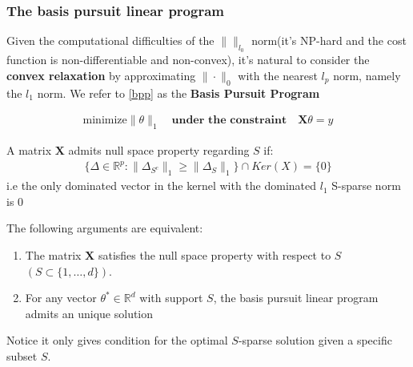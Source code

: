 \begin{method}
\end{method}

\subsubsection*{The basis pursuit linear program}

Given the computational difficulties of the $\|\|_{l_0}$ norm(it's NP-hard and the cost function is non-differentiable and non-convex), it's natural to consider the \textbf{convex relaxation} by approximating $\|\cdot\|_0$ with the nearest $l_p$ norm, namely the $l_1$ norm. We refer to \ref{bpp} as the \textbf{Basis Pursuit Program}

\begin{method}
\begin{align}\label{bpp}
	\text{minimize} \|\theta\|_1 \quad \textbf{under the constraint}\quad \mathbf{X} \theta = y
\end{align}
\end{method}


\begin{definition}
	A matrix $\mathbf{X}$ admits null space property regarding $S$ if:
	\begin{align*}
		\{ \Delta \in \mathbb{R}^p: \|\Delta_{S^c}\|_1 \geq \|\Delta_S\|_1 \} \cap Ker(X) = \{0\}
	\end{align*}
	i.e the only dominated vector in the kernel with the dominated $l_1$ S-sparse norm is 0
\end{definition} 

\begin{theorem}
	The following arguments are equivalent:
	\begin{enumerate}
		\item The matrix $\mathbf{X}$ satisfies the null space property with respect to $S$ $(S \subset\{1, \dots, d\})$.
		\item For any vector $\theta^* \in \mathbb{R}^d$ with support $S$, the basis pursuit linear program admits an unique solution
	\end{enumerate}
\end{theorem}
\begin{remark}
Notice it only gives condition for the optimal $S$-sparse solution	 given a specific subset $S$. 
\end{remark}

